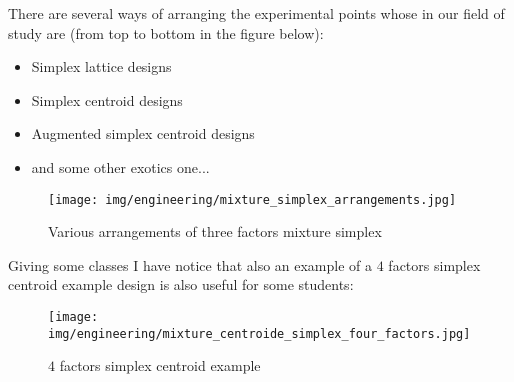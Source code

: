 	There are several ways of arranging the experimental points whose in our field of study are (from top to bottom in the figure below):
	\begin{itemize}
		\item Simplex lattice designs
		\item Simplex centroid designs
		\item Augmented simplex centroid designs
		\item and some other exotics one...
	\end{itemize}
	\begin{figure}[H]
		\centering
		\texttt{[image: img/engineering/mixture\_simplex\_arrangements.jpg]}	
		\caption{Various arrangements of three factors mixture simplex}
	\end{figure}
	Giving some classes I have notice that also an example of a $4$ factors simplex centroid example design is also useful for some students:
	\begin{figure}[H]
		\centering
		\texttt{[image: img/engineering/mixture\_centroide\_simplex\_four\_factors.jpg]}	
		\caption{$4$ factors simplex centroid example}
	\end{figure}
	
